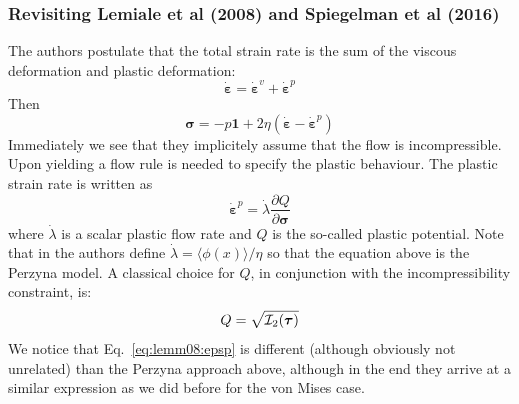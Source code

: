 \subsubsection{Revisiting Lemiale et al (2008) and Spiegelman et al (2016) }
The authors postulate that the total strain rate is the sum of 
the viscous deformation and plastic deformation:
\[
\dot{\bm \varepsilon} = \dot{\bm \varepsilon}^v + \dot{\bm \varepsilon}^p
\]
Then 
\begin{equation}
\bm \sigma = -p \bm 1 + 2\eta (\dot{\bm \varepsilon} -\dot{\bm \varepsilon}^p)
\label{eq:abcd}
\end{equation}
Immediately we see that they implicitely assume that the flow is incompressible.
Upon yielding a flow rule is needed to specify the plastic 
behaviour. The plastic strain rate is written as
\begin{equation}
\label{eq:lemm08:epsp}
\dot{\bm \varepsilon}^p = \dot\lambda \frac{\partial Q}{\partial \bm\sigma}
\end{equation}
where $\dot\lambda$ is a scalar plastic flow rate and $Q$ is the so-called plastic potential. 
Note that in \textcite{hesd02} the authors define $\dot{\lambda}=\langle \phi(x) \rangle/\eta$
so that the equation above is the Perzyna model. 
A classical choice for $Q$, in conjunction with the incompressibility constraint, is:
\[
Q = \sqrt{ {\cal I}_2(\bm\tau)}
\]
We notice that Eq.~\ref{eq:lemm08:epsp} is different (although obviously not unrelated) 
than the Perzyna approach above, although
in the end they arrive at a similar expression as we did before for the von Mises case.


